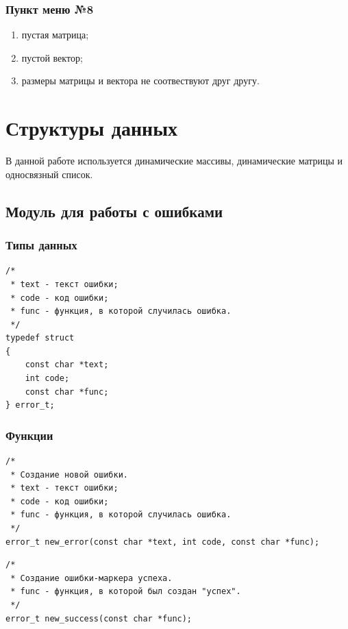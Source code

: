 \documentclass[a4paper,12pt]{extarticle}
\begin{document}
\subsubsection{Пункт меню №8}
\begin{enumerate}
    \item пустая матрица;
    \item пустой вектор;
    \item размеры матрицы и вектора не соотвествуют друг другу.
\end{enumerate}

\newpage

\section{Структуры данных}
В данной работе используется динамические массивы, динамические матрицы и односвязный список.

\subsection{Модуль для работы с ошибками}
\subsubsection{Типы данных}
\begin{verbatim}
/*
 * text - текст ошибки;
 * code - код ошибки;
 * func - функция, в которой случилась ошибка.
 */
typedef struct 
{
    const char *text;
    int code;
    const char *func;
} error_t;
\end{verbatim}




\subsubsection{Функции}
\begin{verbatim}
/*
 * Создание новой ошибки.
 * text - текст ошибки;
 * code - код ошибки;
 * func - функция, в которой случилась ошибка.
 */
error_t new_error(const char *text, int code, const char *func);
\end{verbatim}


 \vspace{0.5cm}


\begin{verbatim}
/*
 * Создание ошибки-маркера успеха.
 * func - функция, в которой был создан "успех".
 */
error_t new_success(const char *func);
\end{verbatim}
\end{document}
